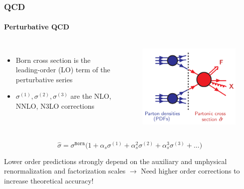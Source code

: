 \documentclass[aspectratio=43]{beamer}
\begin{document}
\begin{frame}

	\frametitle{QCD}
	\framesubtitle{Perturbative QCD}
	
	\begin{columns}
		
		
		\begin{itemize}
			\item Born cross section is the leading-order (LO) term of the perturbative series
			\item $\sigma^{(1)}, \sigma^{(2)}, \sigma^{(3)}$ are the NLO, NNLO, N3LO corrections
		\end{itemize}
		
		\begin{figure}[!htb]
			\includegraphics[width = 5 cm]{plots/factorization_3.png}
		\end{figure}
	
	\end{columns}
	
	\begin{equation}
		\hat{\sigma} = \sigma^{\texttt{Born}} \Big( 1 +
		\alpha_{s} \sigma^{(1)} + 
		\alpha_{s}^{2} \sigma^{(2)} + 
		\alpha_{s}^{3} \sigma^{(3)} + ... \Big) \nonumber
	\end{equation}
	
	Lower order predictions strongly depend on the auxiliary and unphysical renormalization and factorization scales $\longrightarrow$ {\color{red}Need higher order corrections to increase theoretical accuracy!}

\end{frame}

\begin{frame}


\end{frame}
\end{document}
